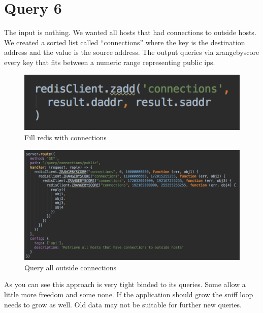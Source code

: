 \section{Query 6}
The input is nothing. We wanted all hosts that had connections to outside hosts. We created a sorted list called “connections” where the key is the destination address and the value is the source address. The output queries via zrangebyscore every key that fits between a numeric range representing public ips.

  \begin{figure}[H]
	\centerline{\includegraphics[width=1.0\textwidth]{resources/solution2-12.png}}
	\caption{Fill redis with connections}
	\label{query6}
\end{figure}

\begin{figure}[H]
	\centerline{\includegraphics[width=1.0\textwidth]{resources/solution2-13.png}}
	\caption{Query all outside connections}
	\label{query66}
\end{figure}

As you can see this approach is very tight binded to its queries. Some allow a little more freedom and some none. If the application should grow the sniff loop needs to grow as well. Old data may not be suitable for further new queries.

